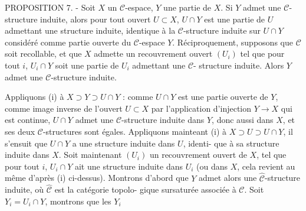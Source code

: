 PROPOSITION 7. - Soit $X$ un $\mathcal{C}$-espace, $Y$ une partie de $X$. Si $Y$ admet une
$\mathcal{C}$-structure induite, alors pour tout ouvert $U \subset X$, $U \cap Y$ est une partie
de $U$ admettant une structure induite, identique à la $\mathcal{C}$-structure induite
sur $U \cap Y$ considéré comme partie ouverte du $\mathcal{C}$-espace $Y$. Réciproquement,
supposons que $\mathcal{C}$ soit recollable, et que $X$ admette un recouvrement ouvert
$(U_i)$ tel que pour tout $i$, $U_i \cap Y$ soit une partie de $U_i$ admettant une $\mathcal{C}$-
structure induite. Alors $Y$ admet une $\mathcal{C}$-structure induite.

Appliquons (i) à $X \supset Y \supset U \cap Y$ : comme $U \cap Y$ est une partie ouverte de $Y$,
comme image inverse de l'ouvert $U \subset X$ par l'application d'injection $Y \to X$
qui est continue, $U \cap Y$ admet une $\mathcal{C}$-structure induite dans $Y$, donc aussi
dans $X$, et ses deux $\mathcal{C}$-structures sont égales. Appliquons mainteant (i)
à $X \supset U \supset U \cap Y$, il s'ensuit que $U \cap Y$ a une structure induite dans $U$, identi-
que à sa structure induite dans $X$. Soit maintenant $(U_i)$ un recouvrement
ouvert de $X$, tel que pour tout $i$, $U_i \cap Y$ ait une structure induite dans $U_i$
(ou dans $X$, cela revient au même d'après (i) ci-dessus). Montrons d'abord
que $Y$ admet alors une $\hat{\mathcal{C}}$-structure induite, où $\hat{\mathcal{C}}$ est la catégorie topolo-
gique sursaturée associée à $\mathcal{C}$. Soit $Y_i = U_i \cap Y$, montrons que les $Y_i$

\newpage



